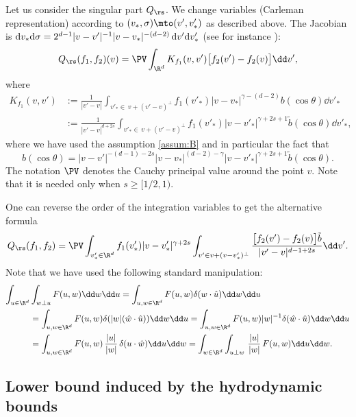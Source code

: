 Let us consider the singular part $Q_{\rs}$. We change variables (Carleman
representation) according to $(v_*,\sigma) \mto (v',v'_*)$ as
described above. The Jacobian is
${\rm d} v_* {\rm d}\sigma = 2^{d-1} |v-v'|^{-1} |v-v_*|^{-(d-2)} \, {\rm d} v'
{\rm d} v'_*$ (see for instance \cite[Lem.\,A.1]{luis}):
\begin{equation}\label{eq:Carl-rep}
Q_{\rs}(f_1,f_2)(v) = \PV \int_{\R^d} K_{f_1}(v,v') \big[ f_2(v')-f_2(v) \big] \dd v',
\end{equation}
where
\begin{align} \nonumber
K_{f_1}(v,v') & := \frac{1}{|v'-v|} \int_{v'_* \in \, v +
(v'-v)^\bot} f_1(v'_*) |v-v_*|^{\gamma-(d-2)} b(\cos \theta) \dd
v'_* \\ \label{e:kernel-K}
& := \frac{1}{|v'-v|^{d+2s}} \int_{v'_* \in \, v +
(v'-v)^\bot} f_1(v'_*) |v-v'_*|^{\gamma+2s+1} \tilde b(\cos \theta) \dd
v'_*,
\end{align}
where we have used the assumption \eqref{assum:B} and in particular
the fact that
\[
b(\cos \theta) = |v-v'|^{-(d-1)-2s}
|v-v_*|^{(d-2)-\gamma} |v-v'_*|^{\gamma+2s+1} \tilde b(\cos
\theta).
\]
The notation $\PV$ denotes the Cauchy principal value around
the point $v$. Note that it is needed only when $s \ge [1/2,1)$.

One can reverse the order of the integration variables to get the
alternative formula%
\begin{equation}\label{eq:Carl-rep-reverse}
Q_{\rs}(f_1,f_2) = \PV \int_{v'_* \in \R^d} f_1(v'_*) |v-v'_*|^{\gamma+2s}
\int_{v'\in v +
(v-v'_*)^\bot} \frac{\big[ f_2(v')-f_2(v) \big] \tilde b}{|v'-v|^{d-1+2s}} \dd v'.
\end{equation}
Note that we have used the following standard manipulation:
\begin{align*}
\int_{u \in \R^d} &\int_{w \bot u} F(u,w) \dd w \dd u = \int_{u,w\in \R^d}
F(u,w) \delta(w \cdot \hat u) \dd w \dd u \\
& = \int_{u,w\in \R^d} F(u,w) \delta(|w| (\hat w \cdot \hat u))
\dd w \dd u
= \int_{u,w\in \R^d} F(u,w) |w|^{-1} \delta(\hat w \cdot \hat
u) \dd w \dd u\\
& = \int_{u,w\in \R^d} F(u,w) \,\frac{|u|}{|w|}\, \delta(u \cdot \hat
w) \dd u \dd w = \int_{w \in \R^d} \int_{u \bot w}
\,\frac{|u|}{|w|}\, F(u,w) \dd u \dd w.
\end{align*}

\subsection{Lower bound induced by the hydrodynamic bounds}

